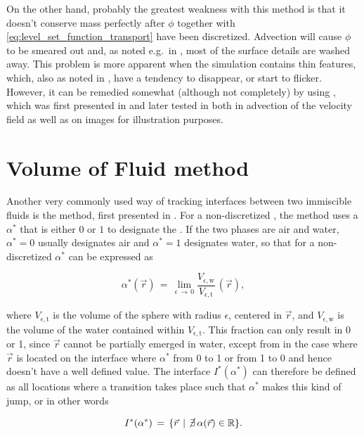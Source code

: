 On the other hand, probably the greatest weakness with this method is that it doesn't conserve mass perfectly after $\phi$ together with \eqref{eq:level_set_function_transport} have been discretized. Advection will cause $\phi$ to be smeared out and, as noted e.g.\ in \citep{Wojtan2009}, most of the surface details are washed away. This problem is more apparent when the simulation contains thin features, which, also as noted in \citep{Wojtan2009}, have a tendency to disappear, or start to flicker. However, it can be remedied somewhat (although not completely) by using \BFECC, which was first presented in \citep{Dupont2003} and later tested in \citep{Kim2005} both in advection of the velocity field as well as on images for illustration purposes.

\section{Volume of Fluid method}

Another very commonly used way of tracking interfaces between two immiscible fluids is the \VOF method, first presented in \citep{Hirt1981}. For a non-discretized \PDE, the \VOF method uses a  $\alpha^*$ that is either $0$ or $1$ to designate the \phase. If the two phases are air and water, $\alpha^* = 0$ usually designates air and $\alpha^* = 1$ designates water, so that for a non-discretized \PDE $\alpha^*$ can be expressed as

\begin{equation} \label{eq:phase_fraction_continuous}
\alpha^*(\vec{r}) \,=\, \lim_{\epsilon\,\rightarrow\,0} \frac{V_{\epsilon,\text{w}}}{V_{\epsilon,\text{t}}}\,(\vec{r}),
\end{equation}

where $V_{\epsilon,\text{t}}$ is the volume of the sphere with radius $\epsilon$, centered in $\vec{r}$, and $V_{\epsilon,\text{w}}$ is the volume of the water contained within $V_{\epsilon,\text{t}}$. This fraction can only result in 0 or 1, since $\vec{r}$ cannot be partially emerged in water, except from in the case where $\vec{r}$ is located on the interface where $\alpha^*$  from 0 to 1 or from 1 to 0 and hence doesn't have a well defined value. The interface $I^*(\alpha^*)$ can therefore be defined as all locations where a transition takes place such that $\alpha^*$ makes this kind of jump, or in other words

\begin{equation} \label{eq:vof_interface_continuous}
I^*(\alpha^*) \,=\, \{\vec{r} \,\mid\, \cancel{\exists}\,\alpha(\vec{r})\in\mathbb{R}\}.
\end{equation}


